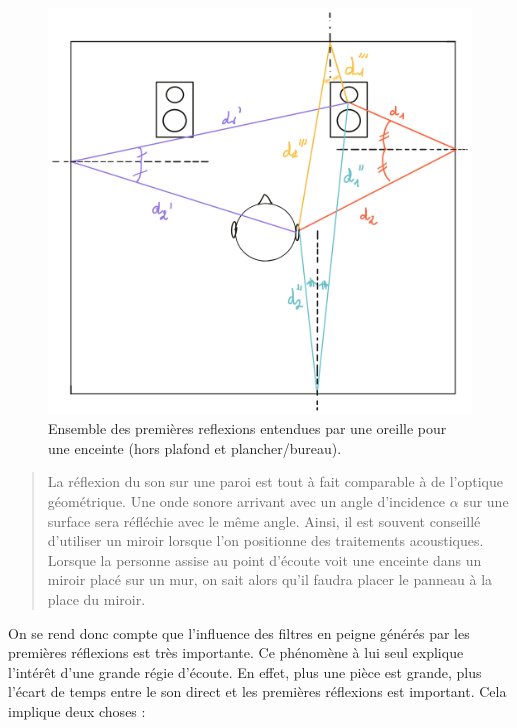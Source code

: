 \documentclass[
]{book}
\begin{document}
\begin{figure}

{\centering \includegraphics{_resources/drawings/roomPr} 

}

\caption{Ensemble des premières reflexions entendues par une oreille pour une enceinte (hors plafond et plancher/bureau).}\label{fig:unnamed-chunk-12}
\end{figure}

\begin{quote}
La réflexion du son sur une paroi est tout à fait comparable à de l'optique géométrique. Une onde sonore arrivant avec un angle d'incidence \(\alpha\) sur une surface sera réfléchie avec le même angle. Ainsi, il est souvent conseillé d'utiliser un miroir lorsque l'on positionne des traitements acoustiques. Lorsque la personne assise au point d'écoute voit une enceinte dans un miroir placé sur un mur, on sait alors qu'il faudra placer le panneau à la place du miroir.
\end{quote}

On se rend donc compte que l'influence des filtres en peigne générés par les premières réflexions est très importante. Ce phénomène à lui seul explique l'intérêt d'une grande régie d'écoute. En effet, plus une pièce est grande, plus l'écart de temps entre le son direct et les premières réflexions est important. Cela implique deux choses :
\end{document}
